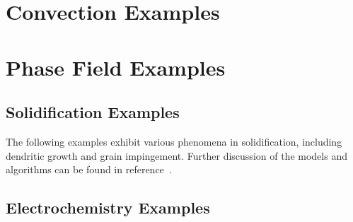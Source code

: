 \documentclass[tocAsPDFpart]{fipy}
\begin{document}
\chapter{Convection Examples}


% 

% 
% 

\chapter{Phase Field Examples}

\section*{Solidification Examples}

The following examples exhibit various phenomena in solidification, including
dendritic growth and grain impingement.  Further discussion of the
models and algorithms can be found in
reference~\cite{WarrenPolycrystal}.






% 
% 
% 
\newpage

\section*{Electrochemistry Examples}


\end{document}
